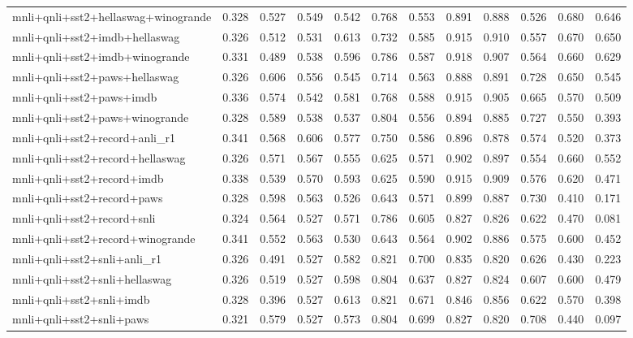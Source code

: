 \begin{table}[t]
\begin{tabular}{lrrrrrrrrrrr}
    mnli+qnli+sst2+hellaswag+winogrande & 0.328 & 0.527 & 0.549 & 0.542 & 0.768 & 0.553 & 0.891 & 0.888 & 0.526 & 0.680 & 0.646 \\
    mnli+qnli+sst2+imdb+hellaswag & 0.326 & 0.512 & 0.531 & 0.613 & 0.732 & 0.585 & 0.915 & 0.910 & 0.557 & 0.670 & 0.650 \\
    mnli+qnli+sst2+imdb+winogrande & 0.331 & 0.489 & 0.538 & 0.596 & 0.786 & 0.587 & 0.918 & 0.907 & 0.564 & 0.660 & 0.629 \\
    mnli+qnli+sst2+paws+hellaswag & 0.326 & 0.606 & 0.556 & 0.545 & 0.714 & 0.563 & 0.888 & 0.891 & 0.728 & 0.650 & 0.545 \\
    mnli+qnli+sst2+paws+imdb & 0.336 & 0.574 & 0.542 & 0.581 & 0.768 & 0.588 & 0.915 & 0.905 & 0.665 & 0.570 & 0.509 \\
    mnli+qnli+sst2+paws+winogrande & 0.328 & 0.589 & 0.538 & 0.537 & 0.804 & 0.556 & 0.894 & 0.885 & 0.727 & 0.550 & 0.393 \\
    mnli+qnli+sst2+record+anli\_r1 & 0.341 & 0.568 & 0.606 & 0.577 & 0.750 & 0.586 & 0.896 & 0.878 & 0.574 & 0.520 & 0.373 \\
    mnli+qnli+sst2+record+hellaswag & 0.326 & 0.571 & 0.567 & 0.555 & 0.625 & 0.571 & 0.902 & 0.897 & 0.554 & 0.660 & 0.552 \\
    mnli+qnli+sst2+record+imdb & 0.338 & 0.539 & 0.570 & 0.593 & 0.625 & 0.590 & 0.915 & 0.909 & 0.576 & 0.620 & 0.471 \\
    mnli+qnli+sst2+record+paws & 0.328 & 0.598 & 0.563 & 0.526 & 0.643 & 0.571 & 0.899 & 0.887 & 0.730 & 0.410 & 0.171 \\
    mnli+qnli+sst2+record+snli & 0.324 & 0.564 & 0.527 & 0.571 & 0.786 & 0.605 & 0.827 & 0.826 & 0.622 & 0.470 & 0.081 \\
    mnli+qnli+sst2+record+winogrande & 0.341 & 0.552 & 0.563 & 0.530 & 0.643 & 0.564 & 0.902 & 0.886 & 0.575 & 0.600 & 0.452 \\
    mnli+qnli+sst2+snli+anli\_r1 & 0.326 & 0.491 & 0.527 & 0.582 & 0.821 & 0.700 & 0.835 & 0.820 & 0.626 & 0.430 & 0.223 \\
    mnli+qnli+sst2+snli+hellaswag & 0.326 & 0.519 & 0.527 & 0.598 & 0.804 & 0.637 & 0.827 & 0.824 & 0.607 & 0.600 & 0.479 \\
    mnli+qnli+sst2+snli+imdb & 0.328 & 0.396 & 0.527 & 0.613 & 0.821 & 0.671 & 0.846 & 0.856 & 0.622 & 0.570 & 0.398 \\
    mnli+qnli+sst2+snli+paws & 0.321 & 0.579 & 0.527 & 0.573 & 0.804 & 0.699 & 0.827 & 0.820 & 0.708 & 0.440 & 0.097 \\

\end{tabular}
\end{table}
